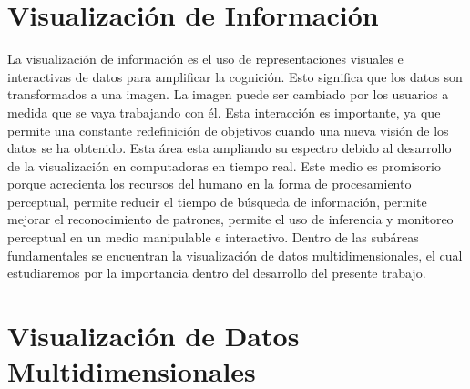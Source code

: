 \section{Visualización de Información}
La visualización de información \cite{card1999readings} es el uso de representaciones visuales e interactivas de datos para amplificar la cognición. Esto significa que los datos son transformados a una imagen. La imagen puede ser cambiado por los usuarios a medida que se vaya trabajando con él. Esta interacción es importante, ya que permite una constante redefinición de objetivos cuando una nueva visión de los datos se ha obtenido.
Esta área esta ampliando su espectro debido al desarrollo de la visualización en computadoras en tiempo real. Este medio es promisorio porque acrecienta los recursos del humano en la forma de procesamiento perceptual, permite reducir el tiempo de búsqueda de información, permite mejorar el reconocimiento de patrones, permite el uso de  inferencia y monitoreo perceptual en un medio manipulable e interactivo.
Dentro de las subáreas fundamentales se encuentran la visualización de datos multidimensionales, el cual estudiaremos por la importancia dentro del desarrollo del presente trabajo.
\section{Visualización de Datos Multidimensionales}
